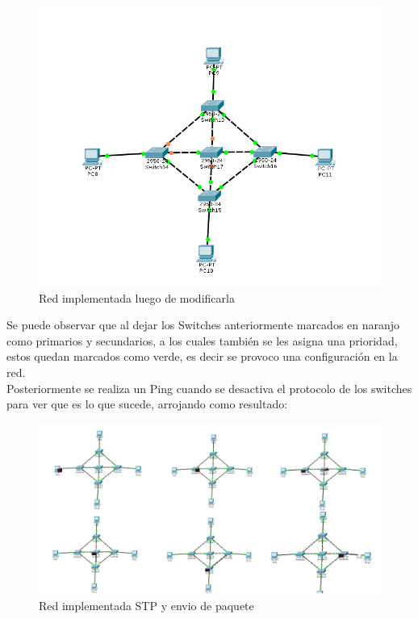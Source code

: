 \documentclass[spanish]{udpreport}
\begin{document}
\begin{figure}[h]
    \centering
    \includegraphics[scale=0.4]{images/modificado.png}
    \caption{Red implementada luego de modificarla}
    \label{fig:my_label}
\end{figure}
\newpage
Se puede observar que al dejar los Switches anteriormente marcados en naranjo como primarios y secundarios, a los cuales también se les asigna una prioridad, estos quedan marcados como verde, es decir se provoco una configuración en la red.
\\Posteriormente se realiza un Ping cuando se desactiva el protocolo de los switches para ver que es lo que sucede, arrojando como resultado:
\begin{figure}[h]
    \centering
    \includegraphics[scale=0.1]{images/1.png}
    \caption{Red implementada STP y envio de paquete}
    \label{fig:my_label}
\end{figure}
\end{document}
